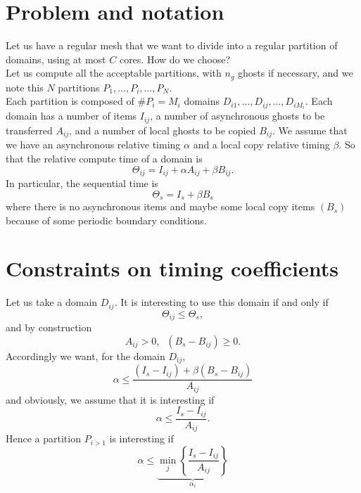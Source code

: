 \documentclass[aps,onecolumn,11pt]{revtex4}
\begin{document}
\section{Problem and notation}
Let us have a regular mesh that we want to divide into a regular partition of domains, using at most $C$ cores.
How do we choose?\\
Let us compute all the acceptable partitions, with $n_g$ ghosts if necessary, and we note this $N$ partitions 
$P_1,\ldots,P_i,\ldots,P_N$.\\
Each partition is composed of $\#P_i=M_i$ domains $D_{i1},\ldots,D_{ij},\ldots,D_{iM_i}$.
Each domain has a number of items $I_{ij}$, a number of asynchronous ghosts to be transferred $A_{ij}$, 
and a number of local ghosts to be copied $B_{ij}$. We assume that we have an asynchronous relative
timing $\alpha$ and a local copy relative timing $\beta$.
So that the relative compute time of a domain is
$$
	\Theta_{ij} = I_{ij} + \alpha A_{ij} + \beta B_{ij}.
$$
In particular, the sequential time is
$$
	\Theta_{s} = I_s + \beta B_s
$$
where there is no asynchronous items and maybe some local copy items $(B_s)$ because of some periodic boundary conditions.


\section{Constraints on timing coefficients}
Let us take a domain $D_{ij}$. It is interesting to use this domain if and only if
$$
	\Theta_{ij} \leq \Theta_s,
$$
and by construction
$$
	A_{ij}>0, \;\; \left(B_s-B_{ij}\right) \geq 0.
$$
Accordingly we want, for the domain $D_{ij}$,
$$
\alpha \leq \dfrac{\left(I_s-I_{ij}\right) + \beta \left(B_s-B_{ij}\right)}{A_{ij}}
$$
and obviously, we assume that it is interesting if
$$
	\alpha \leq \dfrac{I_s-I_{ij}}{A_{ij}}.
$$
Hence a partition $P_{i>1}$ is interesting if
\begin{equation}
	\alpha \leq \underbrace{\min_{j} \left\lbrace \dfrac{I_s-I_{ij}}{A_{ij}} \right\rbrace}_{\alpha_i}
\end{equation}
\end{document}
